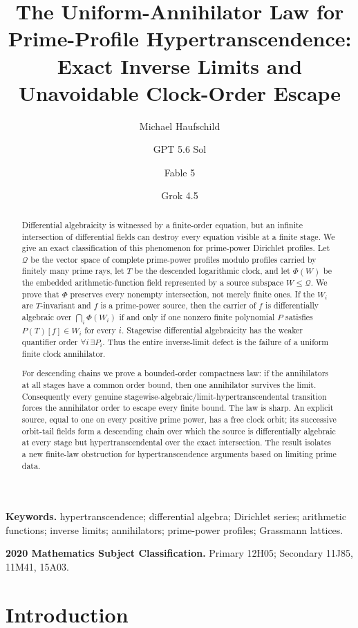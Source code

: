 \documentclass[11pt]{article}
\title{The Uniform-Annihilator Law for Prime-Profile Hypertranscendence:\\
Exact Inverse Limits and Unavoidable Clock-Order Escape}
\author{Michael Haufschild \and GPT 5.6 Sol \and Fable 5 \and Grok 4.5}
\date{}
\theoremstyle{definition}
\theoremstyle{remark}
\newcommand{\Q}{\mathcal Q}
\begin{document}
\maketitle

\begin{abstract}
Differential algebraicity is witnessed by a finite-order equation, but an infinite intersection
of differential fields can destroy every equation visible at a finite stage.  We give an exact
classification of this phenomenon for prime-power Dirichlet profiles.  Let $\Q$ be the vector
space of complete prime-power profiles modulo profiles carried by finitely many prime rays, let
$T$ be the descended logarithmic clock, and let $\Phi(W)$ be the embedded arithmetic-function
field represented by a source subspace $W\leq\Q$.  We prove that $\Phi$ preserves every nonempty
intersection, not merely finite ones.  If the $W_i$ are $T$-invariant and $f$ is a prime-power
source, then the carrier of $f$ is differentially algebraic over
$\bigcap_i\Phi(W_i)$ if and only if one nonzero finite polynomial $P$ satisfies
$P(T)[f]\in W_i$ for every $i$.  Stagewise differential algebraicity has the weaker quantifier
order $\forall i\,\exists P_i$.  Thus the entire inverse-limit defect is the failure of a uniform
finite clock annihilator.

For descending chains we prove a bounded-order compactness law: if the annihilators at all stages
have a common order bound, then one annihilator survives the limit.  Consequently every genuine
stagewise-algebraic/limit-hypertranscendental transition forces the annihilator order to escape
every finite bound.  The law is sharp.  An explicit source, equal to one on every positive prime
power, has a free clock orbit; its successive orbit-tail fields form a descending chain over which
the source is differentially algebraic at every stage but hypertranscendental over the exact
intersection.  The result isolates a new finite-law obstruction for hypertranscendence arguments
based on limiting prime data.
\end{abstract}

\medskip
\noindent\textbf{Keywords.}
hypertranscendence; differential algebra; Dirichlet series; arithmetic functions; inverse limits;
annihilators; prime-power profiles; Grassmann lattices.

\medskip
\noindent\textbf{2020 Mathematics Subject Classification.}
Primary 12H05; Secondary 11J85, 11M41, 15A03.

\section{Introduction}
\end{document}
